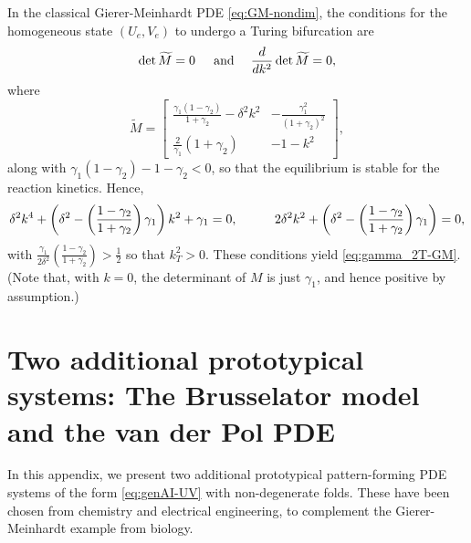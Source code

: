 \documentclass[11pt]{article}
\numberwithin{equation}{section}
\begin{document}
In the classical Gierer-Meinhardt PDE \eqref{eq:GM-nondim}, the conditions for the homogeneous state $(U_e,V_e)$ to undergo a Turing bifurcation are 
\begin{equation*}
    \det \widetilde{M} =0 \hskip0.2truein {\rm and} \hskip0.18truein \frac{d}{dk^2} \det \widetilde{M} = 0,
\end{equation*}
where 
$$
\widetilde{M} = \left[ 
\begin{array}{cc}
\frac{\gamma_1(1-\gamma_2)}{1+\gamma_2} - \delta^2 k^2 & -\frac{\gamma_1^2}{(1+\gamma_2)^2} \\
\frac{2}{\gamma_1}(1+\gamma_2) & -1 -k^2 
\end{array}
\right],
$$
along with $\gamma_1(1-\gamma_2) - 1 - \gamma_2 < 0$, 
so that the equilibrium is stable for the reaction kinetics. 
Hence,
\begin{equation*} 
\delta^2 k^4 + \left( \delta^2 - \left(\frac{1-\gamma_2}{1+\gamma_2}\right)\gamma_1\right) k^2 + \gamma_1 = 0, \hskip0.4truein 
2\delta^2 k^2 + \left(\delta^2 - \left( \frac{1-\gamma_2}{1+\gamma_2}\right) \gamma_1  \right) = 0,
\end{equation*}
with $\frac{\gamma_1}{2\delta^2}\left( \frac{1-\gamma_2}{1+\gamma_2} \right) > \frac{1}{2}$
so that $k_T^2 > 0$.
These conditions yield \eqref{eq:gamma_2T-GM}.
(Note that, with $k=0$, the determinant of $M$ is just $\gamma_1$, and hence positive by assumption.)




\section{Two additional prototypical systems: The Brusselator model and the van der Pol PDE}\label{app:examples}

In this appendix, we present two additional prototypical pattern-forming PDE systems of the form \eqref{eq:genAI-UV} with non-degenerate folds. 
These have been chosen from chemistry and electrical engineering, to complement the Gierer-Meinhardt example from biology.
\end{document}
